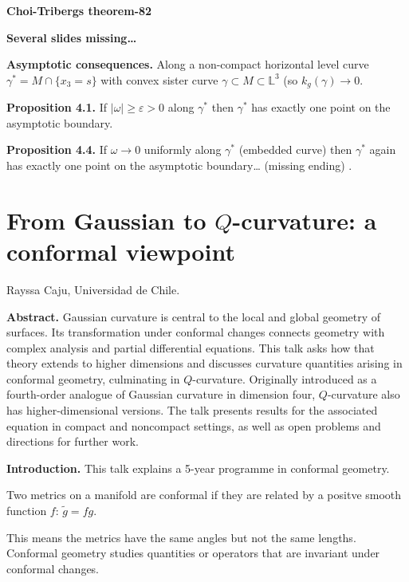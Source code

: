 \medskip\noindent
{\bf Choi-Tribergs theorem-82}

\medskip\noindent
{\bf Several slides missing…}

\medskip\noindent
{\bf Asymptotic consequences.}
Along a non-compact horizontal level curve
$\gamma^*=M \cap \{x_3=s\}$ with convex
sister curve $\gamma \subset M \subset
\mathbb{L}^3$ (so $k_g(\gamma) \to 0$.

\noindent
{\bf Proposition 4.1.} If $|\omega| \geq
\varepsilon>0$ along $\gamma^*$ then
$\gamma^*$ has exactly one point on
the asymptotic boundary.

\noindent
{\bf Proposition 4.4.} If $\omega \to 0$
uniformly along $\gamma^*$ (embedded curve)
then $\gamma^*$ again has exactly one point
on the asymptotic boundary… (missing ending)
.

\section{From Gaussian to
$Q$-curvature: a conformal viewpoint}
\label{section-gaussian-q-curvature}

\medskip\noindent
Rayssa Caju,
Universidad de Chile.

\medskip\noindent
{\bf Abstract.}
Gaussian curvature is central to the local
and global geometry of surfaces. Its
transformation under conformal changes
connects geometry with complex analysis
and partial differential equations. This
talk asks how that theory extends to higher
dimensions and discusses curvature
quantities arising in conformal geometry,
culminating in $Q$-curvature. Originally
introduced as a fourth-order analogue of
Gaussian curvature in dimension four,
$Q$-curvature also has higher-dimensional
versions. The talk presents results for
the associated equation in compact and
noncompact settings, as well as open
problems and directions for further work.


\medskip\noindent
{\bf Introduction.} This talk explains
a 5-year programme in conformal geometry.

\begin{definition}
\label{definition-conformal-metrics}
Two metrics on a manifold are conformal
if they are related by a positve smooth
function $f$:
$\tilde{g}=fg$.
\end{definition}

\noindent
This means the metrics have the same angles
but not the same lengths.
Conformal geometry studies quantities
or operators that are invariant under
conformal changes.

